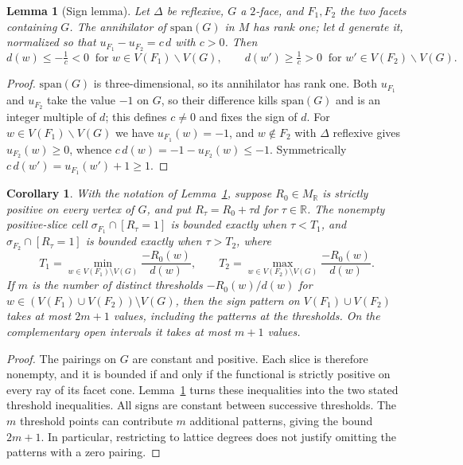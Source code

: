 \documentclass[11pt]{amsart}
\newtheorem{lemma}[theorem]{Lemma}
\newtheorem{corollary}[theorem]{Corollary}
\theoremstyle{definition}
\theoremstyle{remark}
\theoremstyle{plain}
\newcommand{\RR}{\mathbb{R}}
\begin{document}
\begin{lemma}[Sign lemma]\label{lem:sign}
Let $\Delta$ be reflexive, $G$ a $2$-face, and $F_1, F_2$ the two facets
containing $G$.  The annihilator of $\mathrm{span}(G)$ in $M$ has rank one; let
$d$ generate it, normalized so that $u_{F_1} - u_{F_2} = c\,d$ with $c > 0$.
Then
\[
  d(w) \le -\tfrac1c < 0 \ \text{ for } w \in V(F_1)\smallsetminus V(G),
  \qquad
  d(w') \ge \tfrac1c > 0 \ \text{ for } w' \in V(F_2)\smallsetminus V(G).
\]
\end{lemma}

\begin{proof}
$\mathrm{span}(G)$ is three-dimensional, so its annihilator has rank one.  Both
$u_{F_1}$ and $u_{F_2}$ take the value $-1$ on $G$, so their difference kills
$\mathrm{span}(G)$ and is an integer multiple of $d$; this defines $c \ne 0$ and
fixes the sign of $d$.  For $w \in V(F_1) \smallsetminus V(G)$ we have
$u_{F_1}(w) = -1$, and $w \notin F_2$ with $\Delta$ reflexive gives
$u_{F_2}(w) \ge 0$, whence $c\,d(w) = -1 - u_{F_2}(w) \le -1$.  Symmetrically
$c\,d(w') = u_{F_1}(w') + 1 \ge 1$.
\end{proof}

\begin{corollary}\label{cor:thresholds}
With the notation of Lemma~\ref{lem:sign}, suppose $R_0\in M_\RR$ is
strictly positive on every vertex of $G$, and put
$R_\tau=R_0+\tau d$ for $\tau\in\RR$.  The nonempty positive-slice cell
$\sigma_{F_1}\cap[R_\tau=1]$ is bounded exactly when $\tau<T_1$, and
$\sigma_{F_2}\cap[R_\tau=1]$ is bounded exactly when $\tau>T_2$, where
\[
 T_1=\min_{w\in V(F_1)\setminus V(G)}\frac{-R_0(w)}{d(w)},
 \qquad
 T_2=\max_{w\in V(F_2)\setminus V(G)}\frac{-R_0(w)}{d(w)}.
\]
If $m$ is the number of distinct thresholds $-R_0(w)/d(w)$ for
$w\in(V(F_1)\cup V(F_2))\setminus V(G)$, then the sign pattern on
$V(F_1)\cup V(F_2)$ takes at most $2m+1$ values, including the patterns
at the thresholds.  On the complementary open intervals it takes at
most $m+1$ values.
\end{corollary}

\begin{proof}
The pairings on $G$ are constant and positive.  Each slice is therefore
nonempty, and it is bounded if and only if the functional is strictly
positive on every ray of its facet cone.  Lemma~\ref{lem:sign} turns
these inequalities into the two stated threshold inequalities.
All signs are constant between successive thresholds.  The $m$
threshold points can contribute $m$ additional patterns, giving the
bound $2m+1$.  In particular, restricting to lattice degrees does not
justify omitting the patterns with a zero pairing.
\end{proof}
\end{document}
